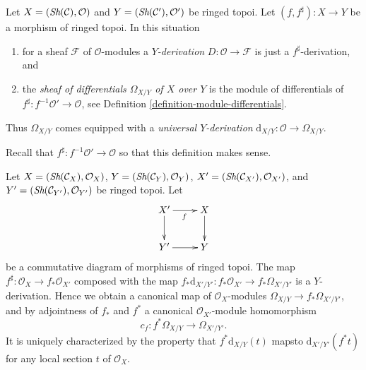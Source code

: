 \begin{definition}
\label{definition-sheaf-differentials}
Let $X = (\mathop{\textit{Sh}}\nolimits(\mathcal{C}), \mathcal{O})$ and
$Y = (\mathop{\textit{Sh}}\nolimits(\mathcal{C}'), \mathcal{O}')$ be ringed topoi.
Let $(f, f^\sharp) : X \to Y$ be a morphism of ringed topoi.
In this situation
\begin{enumerate}
\item for a sheaf $\mathcal{F}$ of $\mathcal{O}$-modules a
{\it $Y$-derivation} $D : \mathcal{O} \to \mathcal{F}$ is just a
$f^\sharp$-derivation, and
\item the {\it sheaf of differentials $\Omega_{X/Y}$ of $X$ over $Y$}
is the module of differentials of
$f^\sharp : f^{-1}\mathcal{O}' \to \mathcal{O}$,
see Definition \ref{definition-module-differentials}.
\end{enumerate}
Thus $\Omega_{X/Y}$ comes equipped with a {\it universal $Y$-derivation}
$\text{d}_{X/Y} : \mathcal{O} \longrightarrow \Omega_{X/Y}$.
\end{definition}

\noindent
Recall that $f^\sharp : f^{-1}\mathcal{O}' \to \mathcal{O}$ so that
this definition makes sense.

\begin{lemma}
\label{lemma-functoriality-differentials}
Let
$X = (\mathop{\textit{Sh}}\nolimits(\mathcal{C}_X), \mathcal{O}_X)$,
$Y = (\mathop{\textit{Sh}}\nolimits(\mathcal{C}_Y), \mathcal{O}_Y)$,
$X' = (\mathop{\textit{Sh}}\nolimits(\mathcal{C}_{X'}), \mathcal{O}_{X'})$, and
$Y' = (\mathop{\textit{Sh}}\nolimits(\mathcal{C}_{Y'}), \mathcal{O}_{Y'})$ be ringed topoi.
Let
$$
\xymatrix{
X' \ar[d] \ar[r]_f & X \ar[d] \\
Y' \ar[r] & Y
}
$$
be a commutative diagram of morphisms of ringed topoi. The map
$f^\sharp : \mathcal{O}_X \to f_*\mathcal{O}_{X'}$ composed with the map
$f_*\text{d}_{X'/Y'} : f_*\mathcal{O}_{X'} \to f_*\Omega_{X'/Y'}$ is a
$Y$-derivation. Hence we obtain a canonical map of $\mathcal{O}_X$-modules
$\Omega_{X/Y} \to f_*\Omega_{X'/Y'}$, and by
adjointness of $f_*$ and $f^*$ a
canonical $\mathcal{O}_{X'}$-module homomorphism
$$
c_f : f^*\Omega_{X/Y} \longrightarrow \Omega_{X'/Y'}.
$$
It is uniquely characterized by the property that
$f^*\text{d}_{X/Y}(t)$ mapsto $\text{d}_{X'/Y'}(f^* t)$
for any local section $t$ of $\mathcal{O}_X$.
\end{lemma}

